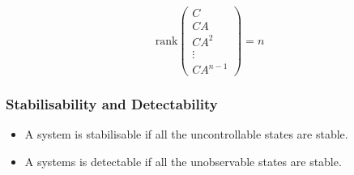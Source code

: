 \[
\mathrm{rank} \begin{pmatrix}
C       \\
CA      \\
CA^{2}  \\
\vdots  \\
CA^{n-1}
\end{pmatrix} 
= n
\]

\subsubsection{Stabilisability and Detectability}
\begin{itemize}
    \item A system is stabilisable if all the uncontrollable states are stable.
    
    \item A systems is detectable if all the unobservable states are stable.
\end{itemize}
